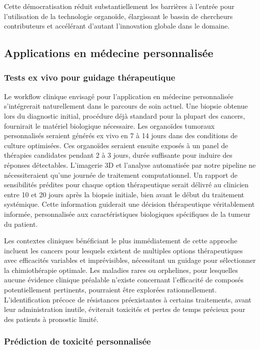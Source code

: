 Cette démocratisation réduit substantiellement les barrières à l'entrée pour l'utilisation de la technologie organoïde, élargissant le bassin de chercheurs contributeurs et accélérant d'autant l'innovation globale dans le domaine.

\subsection{Applications en médecine personnalisée}

\subsubsection{Tests ex vivo pour guidage thérapeutique}

Le workflow clinique envisagé pour l'application en médecine personnalisée s'intégrerait naturellement dans le parcours de soin actuel. Une biopsie obtenue lors du diagnostic initial, procédure déjà standard pour la plupart des cancers, fournirait le matériel biologique nécessaire. Les organoïdes tumoraux personnalisés seraient générés ex vivo en 7 à 14 jours dans des conditions de culture optimisées. Ces organoïdes seraient ensuite exposés à un panel de thérapies candidates pendant 2 à 3 jours, durée suffisante pour induire des réponses détectables. L'imagerie 3D et l'analyse automatisée par notre pipeline ne nécessiteraient qu'une journée de traitement computationnel. Un rapport de sensibilités prédites pour chaque option thérapeutique serait délivré au clinicien entre 10 et 20 jours après la biopsie initiale, bien avant le début du traitement systémique. Cette information guiderait une décision thérapeutique véritablement informée, personnalisée aux caractéristiques biologiques spécifiques de la tumeur du patient.

Les contextes cliniques bénéficiant le plus immédiatement de cette approche incluent les cancers pour lesquels existent de multiples options thérapeutiques avec efficacités variables et imprévisibles, nécessitant un guidage pour sélectionner la chimiothérapie optimale. Les maladies rares ou orphelines, pour lesquelles aucune évidence clinique préalable n'existe concernant l'efficacité de composés potentiellement pertinents, pourraient être explorées rationnellement. L'identification précoce de résistances préexistantes à certains traitements, avant leur administration inutile, éviterait toxicités et pertes de temps précieux pour des patients à pronostic limité.

\subsubsection{Prédiction de toxicité personnalisée}

